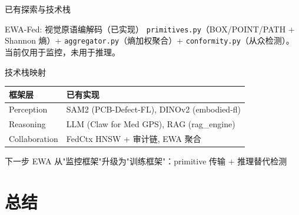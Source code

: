 \documentclass[aspectratio=169, 10pt]{beamer}
\begin{document}
\begin{frame}{已有探索与技术栈}
  \begin{block}{EWA-Fed: 视觉原语编解码（已实现）}
    \texttt{primitives.py}（BOX/POINT/PATH + Shannon 熵）+ \texttt{aggregator.py}（熵加权聚合）+ \texttt{conformity.py}（从众检测）。当前仅用于监控，未用于推理。
  \end{block}
  \vspace{0em}
  \begin{block}{技术栈映射}
    \begin{tabular}{ll}
      \toprule
      框架层 & 已有实现 \\
      \midrule
      Perception & SAM2 (PCB-Defect-FL), DINOv2 (embodied-fl) \\
      Reasoning & LLM (Claw for Med GPS), RAG (rag\_engine) \\
      Collaboration & FedCtx HNSW + 审计链, EWA 聚合 \\
      \bottomrule
    \end{tabular}
  \end{block}
  \vspace{0em}
  \begin{alertblock}{下一步}
    EWA 从"监控框架"升级为"训练框架"：primitive 传输 + 推理替代检测
  \end{alertblock}
\end{frame}

\section{总结}
\end{document}
